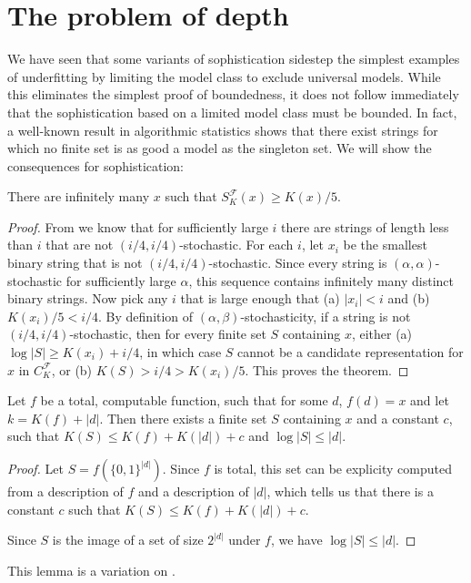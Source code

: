 \documentclass{style/llncs}
\newcommand{\F}{\mathscr F}
\begin{document}
\section{The problem of depth}

We have seen that some variants of sophistication sidestep the simplest examples of underfitting by limiting the model class to exclude universal models. While this eliminates the simplest proof of boundedness, it does not follow immediately that the sophistication based on a limited model class must be bounded. In fact, a well-known result in algorithmic statistics shows that there exist strings for which no finite set is as good a model as the singleton set. We will show the consequences for sophistication:

\begin{theorem}
There are infinitely many $x$ such that $S^\F_K(x) \geq K(x)/5$. \label{theorem:structure-function-is-not-bounded}
\end{theorem}
\begin{proof}
From \cite[Proposition~I.3 (b)]{gacs2001algorithmic} we know that for sufficiently large $i$ there are strings of length less than $i$ that are not $(i/4, i/4)$-stochastic. For each $i$, let $x_i$ be the smallest binary string that is not $(i/4, i/4)$-stochastic. Since every string is $(\alpha,\alpha)$-stochastic for sufficiently large $\alpha$, this sequence contains infinitely many distinct binary strings. Now pick any $i$ that is large enough that (a) $|x_i|<i$ and (b) $K(x_i)/5 < i/4$. By definition of $(\alpha,\beta)$-stochasticity, if a string is not $(i/4,i/4)$-stochastic, then for every finite set $S$ containing $x$, either (a) $\log|S|\ge K(x_i)+i/4$, in which case $S$ cannot be a candidate representation for $x$ in $C^\F_K$, or (b) $K(S)>i/4>K(x_i)/5$. This proves the theorem.
\end{proof}

\begin{lemma}
Let $f$ be a total, computable function, such that for some $d$, $f(d) = x$ and let $k = K(f) + |d|$. Then there exists a finite set $S$ containing $x$ and a constant $c$, such that $K(S) \leq K(f) + K(|d|) + c$ and $\log |S| \leq |d|$.\label{lemma:total-to-sets}
\end{lemma}
\begin{proof}
Let $S = f\left(\{0,1\}^{|d|}\right)$. Since $f$ is total, this set can be explicity computed from a description of $f$ and a description of $|d|$, which tells us that there is a constant $c$ such that $K(S) \leq K(f) + K(|d|) + c$. 

Since $S$ is the image of a set of size $2^{|d|}$ under $f$, we have $\log |S| \leq |d|$.
\end{proof}
This lemma is a variation on \cite[Lemma~7.2]{vitanyi2004meaningful}.
\end{document}
